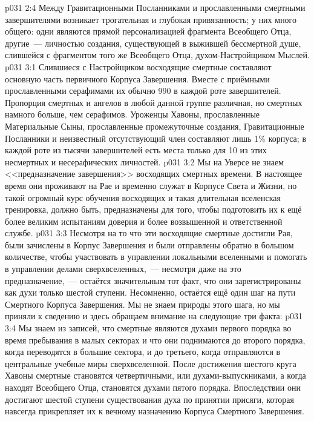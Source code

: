 \vs p031 2:4 Между Гравитационными Посланниками и прославленными смертными завершителями возникает трогательная и глубокая привязанность; у них много общего: одни являются прямой персонализацией фрагмента Всеобщего Отца, другие~--- личностью создания, существующей в выжившей бессмертной душе, слившейся с фрагментом того же Всеобщего Отца, духом\hyp{}Настройщиком Мыслей.
\vs p031 3:1 Слившиеся с Настройщиком восходящие смертные составляют основную часть первичного Корпуса Завершения. Вместе с приёмными прославленными серафимами их обычно 990 в каждой роте завершителей. Пропорция смертных и ангелов в любой данной группе различная, но смертных намного больше, чем серафимов. Уроженцы Хавоны, прославленные Материальные Сыны, прославленные промежуточные создания, Гравитационные Посланники и неизвестный отсутствующий член составляют лишь 1\% корпуса; в каждой роте из тысячи завершителей есть места только для 10 из этих несмертных и несерафических личностей.
\vs p031 3:2 Мы на Уверсе не знаем <<предназначение завершения>> восходящих смертных времени. В настоящее время они проживают на Рае и временно служат в Корпусе Света и Жизни, но такой огромный курс обучения восходящих и такая длительная вселенская тренировка, должно быть, предназначены для того, чтобы подготовить их к ещё более великим испытаниям доверия и более возвышенной и ответственной службе.
\vs p031 3:3 \pc Несмотря на то что эти восходящие смертные достигли Рая, были зачислены в Корпус Завершения и были отправлены обратно в большом количестве, чтобы участвовать в управлении локальными вселенными и помогать в управлении делами сверхвселенных,~--- несмотря даже на это  предназначение,~--- остаётся значительным тот факт, что они зарегистрированы как духи только шестой ступени. Несомненно, остаётся ещё один шаг на пути Смертного Корпуса Завершения. Мы не знаем природы этого шага, но мы приняли к сведению и здесь обращаем внимание на следующие три факта:
\vs p031 3:4 Мы знаем из записей, что смертные являются духами первого порядка во время пребывания в малых секторах и что они поднимаются до второго порядка, когда переводятся в большие сектора, и до третьего, когда отправляются в центральные учебные миры сверхвселенной. После достижения шестого круга Хавоны смертные становятся четвертичными, или духами\hyp{}выпускниками, а когда находят Всеобщего Отца, становятся духами пятого порядка. Впоследствии они достигают шестой ступени существования духа по принятии присяги, которая навсегда прикрепляет их к вечному назначению Корпуса Смертного Завершения.
